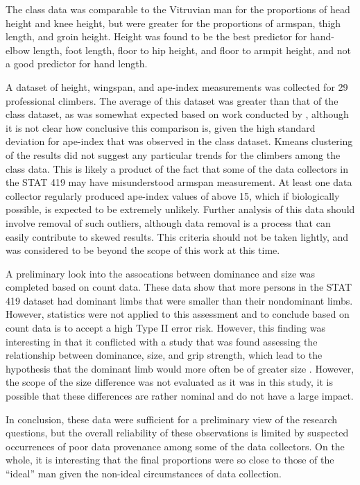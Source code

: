 \documentclass[]{article}
\begin{document}
\indent The class data was comparable to the Vitruvian man for the
proportions of head height and knee height, but were greater for the
proportions of armspan, thigh length, and groin height. Height was found
to be the best predictor for hand-elbow length, foot length, floor to
hip height, and floor to armpit height, and not a good predictor for
hand length.

\indent A dataset of height, wingspan, and ape-index measurements was
collected for 29 professional climbers. The average of this dataset was
greater than that of the class dataset, as was somewhat expected based
on work conducted by \citet{Ozimek:2017}, although it is not clear how
conclusive this comparison is, given the high standard deviation for
ape-index that was observed in the class dataset. Kmeans clustering of
the results did not suggest any particular trends for the climbers among
the class data. This is likely a product of the fact that some of the
data collectors in the STAT 419 may have misunderstood armspan
measurement. At least one data collector regularly produced ape-index
values of above 15, which if biologically possible, is expected to be
extremely unlikely. Further analysis of this data should involve removal
of such outliers, although data removal is a process that can easily
contribute to skewed results. This criteria should not be taken lightly,
and was considered to be beyond the scope of this work at this time.

\indent A preliminary look into the assocations between dominance and
size was completed based on count data. These data show that more
persons in the STAT 419 dataset had dominant limbs that were smaller
than their nondominant limbs. However, statistics were not applied to
this assessment and to conclude based on count data is to accept a high
Type II error risk. However, this finding was interesting in that it
conflicted with a study that was found assessing the relationship
between dominance, size, and grip strength, which lead to the hypothesis
that the dominant limb would more often be of greater size
\citep{Maleki:2019}. However, the scope of the size difference was not
evaluated as it was in this study, it is possible that these differences
are rather nominal and do not have a large impact.

\indent In conclusion, these data were sufficient for a preliminary view
of the research questions, but the overall reliability of these
observations is limited by suspected occurrences of poor data provenance
among some of the data collectors. On the whole, it is interesting that
the final proportions were so close to those of the ``ideal'' man given
the non-ideal circumstances of data collection.
\end{document}

